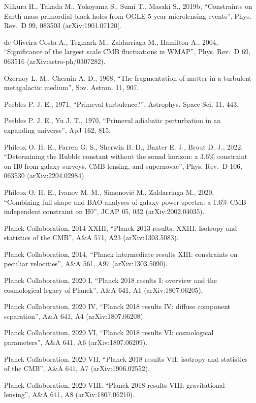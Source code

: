 \documentclass[
  11pt,
]{article}
\begin{document}
Niikura H., Takada M., Yokoyama S., Sumi T., Masaki S., 2019b,
``Constraints on Earth-mass primordial black holes from OGLE 5-year
microlensing events'', Phys. Rev.~D 99, 083503 (arXiv:1901.07120).

de Oliveira-Costa A., Tegmark M., Zaldarriaga M., Hamilton A., 2004,
``Significance of the largest scale CMB fluctuations in WMAP'', Phys.
Rev.~D 69, 063516 (arXiv:astro-ph/0307282).

Ozernoy L. M., Chernin A. D., 1968, ``The fragmentation of matter in a
turbulent metagalactic medium'', Sov. Astron. 11, 907.

Peebles P. J. E., 1971, ``Primeval turbulence?'', Astrophys. Space Sci.
11, 443.

Peebles P. J. E., Yu J. T., 1970, ``Primeval adiabatic perturbation in
an expanding universe'', ApJ 162, 815.

Philcox O. H. E., Farren G. S., Sherwin B. D., Baxter E. J., Brout D.
J., 2022, ``Determining the Hubble constant without the sound horizon: a
3.6\% constraint on H0 from galaxy surveys, CMB lensing, and
supernovae'', Phys. Rev.~D 106, 063530 (arXiv:2204.02984).

Philcox O. H. E., Ivanov M. M., Simonović M., Zaldarriaga M., 2020,
``Combining full-shape and BAO analyses of galaxy power spectra: a 1.6\%
CMB-independent constraint on H0'', JCAP 05, 032 (arXiv:2002.04035).

Planck Collaboration, 2014 XXIII, ``Planck 2013 results. XXIII. Isotropy
and statistics of the CMB'', A\&A 571, A23 (arXiv:1303.5083).

Planck Collaboration, 2014, ``Planck intermediate results XIII:
constraints on peculiar velocities'', A\&A 561, A97 (arXiv:1303.5090).

Planck Collaboration, 2020 I, ``Planck 2018 results I: overview and the
cosmological legacy of Planck'', A\&A 641, A1 (arXiv:1807.06205).

Planck Collaboration, 2020 IV, ``Planck 2018 results IV: diffuse
component separation'', A\&A 641, A4 (arXiv:1807.06208).

Planck Collaboration, 2020 VI, ``Planck 2018 results VI: cosmological
parameters'', A\&A 641, A6 (arXiv:1807.06209).

Planck Collaboration, 2020 VII, ``Planck 2018 results VII: isotropy and
statistics of the CMB'', A\&A 641, A7 (arXiv:1906.02552).

Planck Collaboration, 2020 VIII, ``Planck 2018 results VIII:
gravitational lensing'', A\&A 641, A8 (arXiv:1807.06210).
\end{document}
